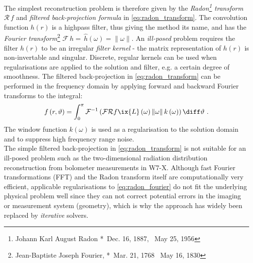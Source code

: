 %
                The simplest reconstruction problem is therefore given by the \textit{Radon\footnote[1]{Johann Karl August Radon *~Dec. 16, 1887, \textdagger~May 25, 1956} transform} $\mathcal{R}\,f$ and \textit{filtered back-projection formula} in \cref{eq:radon_transform}. The convolution function $h\left(r\right)$ is a highpass filter, thus giving the method its name, and has the \textit{Fourier transform}\footnote[2]{Jean-Baptiste Joseph Fourier, *~Mar. 21, 1768 \textdagger~May 16, 1830} $\mathcal{F}\,h=\,\mathrel{\hat{h}}\left(\omega\right)=\left\|\omega\right\|$\cite{Candes2021}. An \textit{ill-posed} problem requires the filter $h\left(r\right)$ to be an irregular \textit{filter kernel} - the matrix representation of $h\left(r\right)$ is non-invertable and singular. Discrete, regular kernels can be used when regularisations are applied to the solution and filter, e.g. a certain degree of smoothness. The filtered back-projection in \autoref{eq:radon_transform} can be performed in the frequency domain by applying forward and backward Fourier transforms to the integral:%
%
                \begin{align}%
                    f\left(r,\vartheta\right)=\int_{0}^{\pi}\mathcal{F}^{-1}\left(\mathcal{F}\mathcal{R}f\ix{L}\left(\omega\right)\left\|\omega\right\|k\left(\omega\right)\right)\diff\vartheta\,\,.\label{eq:radon_fourier}%
                \end{align}%
%
                The window function $k\left(\omega\right)$ is used as a regularisation to the solution domain and to suppress high frequency range noise\cite{Kabanikhin2008}.\\%
                The simple filtered back-projection in \cref{eq:radon_transform} is not suitable for an ill-posed problem such as the two-dimensional radiation distribution reconstruction from bolometer measurements in W7-X. Although fast Fourier transformations (FFT) and the Radon transform itself are computationally very efficient, applicable regularisations to \cref{eq:radon_fourier} do not fit the underlying physical problem well since they can not correct potential errors in the imaging or measurement system (geometry), which is why the approach has widely been replaced by \textit{iterative} solvers.\\%
